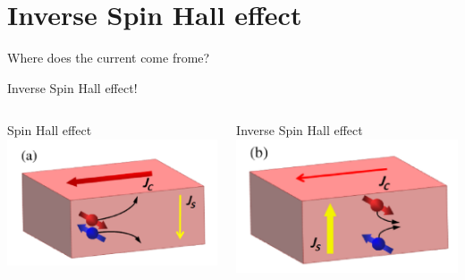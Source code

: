 \documentclass[aspectratio=1610, 9pt]{beamer}
\begin{document}
\section{Inverse Spin Hall effect}
\begin{frame}{Where does the current come frome?}
\begin{center}
\Large Inverse Spin Hall effect!
\normalsize
\end{center}
\begin{columns}
  \begin{column}{0.5\textwidth}
  Spin Hall effect
  \includegraphics[width=\textwidth]{pics/Spin_Hall.png}
  \end{column}
  \begin{column}{0.5\textwidth}
    Inverse Spin Hall effect
    \includegraphics[width=\textwidth]{pics/inv_spin_hall.png}
  \end{column}
\end{columns}
\end{frame}
\end{document}
